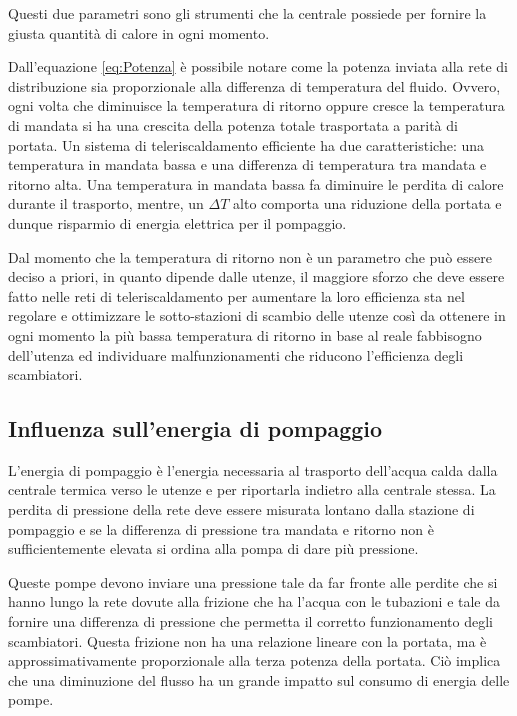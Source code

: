 \documentclass[laurea,oneside,11pt]{USiena_tesiLM}
\begin{document}
Questi due parametri sono gli strumenti che la centrale possiede per fornire la giusta quantità di calore in ogni momento.

Dall'equazione \ref{eq:Potenza} è possibile notare come la potenza inviata alla rete di distribuzione sia proporzionale alla differenza di temperatura del fluido. Ovvero, ogni volta che diminuisce la temperatura di ritorno oppure cresce la temperatura di mandata si ha una crescita della potenza totale trasportata a parità di portata.
Un sistema di teleriscaldamento efficiente ha due caratteristiche: una temperatura in mandata bassa e una differenza di temperatura tra mandata e ritorno alta. Una temperatura in mandata bassa fa diminuire le perdita di calore durante il trasporto, mentre, un $\Delta T$ alto comporta una riduzione della portata e dunque risparmio di energia elettrica per il pompaggio.

Dal momento che la temperatura di ritorno non è un parametro che può essere deciso a priori, in quanto dipende dalle utenze, il maggiore sforzo che deve essere fatto nelle reti di teleriscaldamento per aumentare la loro efficienza sta nel regolare e ottimizzare le sotto-stazioni di scambio delle utenze così da ottenere in ogni momento la più bassa temperatura di ritorno in base al reale fabbisogno dell'utenza ed individuare malfunzionamenti che riducono l'efficienza degli scambiatori. 
\subsection{Influenza sull'energia di pompaggio}
L'energia di pompaggio è l'energia necessaria al trasporto dell'acqua calda dalla centrale termica verso le utenze e per riportarla indietro alla centrale stessa. La perdita di pressione della rete deve essere misurata lontano dalla stazione di pompaggio e se la differenza di pressione tra mandata e ritorno non è sufficientemente elevata si ordina alla pompa di dare più pressione.

Queste pompe devono inviare una pressione  tale da far fronte alle perdite che si hanno lungo la rete dovute alla frizione che ha l'acqua con le tubazioni e tale da fornire una differenza di pressione che permetta il corretto funzionamento degli scambiatori. Questa frizione non ha una relazione lineare con la portata, ma è approssimativamente proporzionale alla terza potenza della portata. Ciò implica che una diminuzione del flusso ha un grande impatto sul consumo di energia delle pompe.
\end{document}
